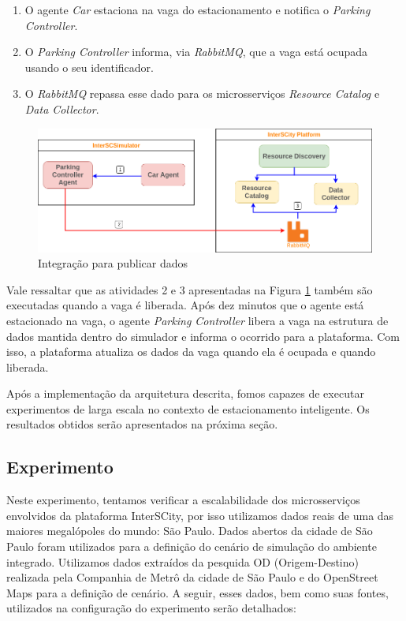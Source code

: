 \begin{enumerate}
    \item O agente \textit{Car} estaciona na vaga do estacionamento e notifica o \textit{Parking Controller}.

	\item O \textit{Parking Controller} informa, via \textit{RabbitMQ}, que a vaga está ocupada usando o seu identificador.

	\item O \textit{RabbitMQ} repassa esse dado para os microsserviços \textit{Resource Catalog} e \textit{Data Collector}.
\end{enumerate}

\begin{figure}[ht]
	\centering
	\includegraphics[width=\textwidth]{figuras/integration_publish_data_smart_parking.png}
	\caption{Integração para publicar dados}
	\label{fig:atualizacao}
\end{figure}

Vale ressaltar que as atividades 2 e 3 apresentadas na Figura \ref{fig:atualizacao} também são executadas quando a vaga é liberada.
Após dez minutos que o agente está estacionado na vaga, o agente \textit{Parking Controller} libera a vaga na estrutura de dados mantida dentro do simulador e informa o
ocorrido para a plataforma.
Com isso, a plataforma atualiza os dados da vaga quando ela é ocupada e quando liberada.

Após a implementação da arquitetura descrita, fomos capazes de executar experimentos de larga escala no contexto de estacionamento inteligente.
Os resultados obtidos serão apresentados na próxima seção.

\subsection{Experimento}
\label{sec:exp_smart_parking}

Neste experimento, tentamos verificar a escalabilidade dos microsserviços envolvidos da plataforma InterSCity, por isso utilizamos dados reais de uma das maiores megalópoles do mundo: São Paulo.
Dados abertos da cidade de São Paulo foram utilizados para a definição do cenário de simulação do ambiente integrado.
Utilizamos dados extraídos da pesquida OD (Origem-Destino) realizada pela Companhia de Metrô da cidade de São Paulo e do OpenStreet Maps para a definição de cenário.
A seguir, esses dados, bem como suas fontes, utilizados na configuração do experimento serão detalhados:

